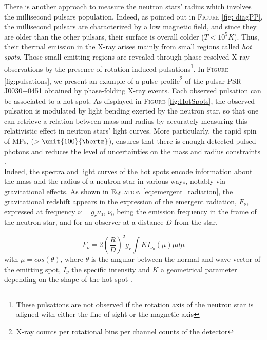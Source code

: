 \documentclass[a4paper, twoside, 12pt]{article}
\numberwithin{equation}{section}
\begin{document}
There is another approach to measure the neutron stars' radius which involves the millisecond pulsars population. Indeed, as pointed out in F\textsc{igure} \ref{fig: diagPP}, the millisecond pulsars are characterized by a low magnetic field, and since they are older than the other pulsars, their surface is overall colder ($T < 10^5 K$). 
Thus, their thermal emission in the X-ray arises mainly from small regions called {\itshape{hot spots}}. Those small emitting regions are revealed through phase-resolved X-ray observations by the presence of rotation-induced pulsations\footnote{These pulsations are not observed if the rotation axis of the neutron star is aligned with either the line of sight or the magnetic axis}. In F\textsc{igure} \ref{fig:pulsations}, we present an example of a pulse profile\footnote{ X-ray counts per rotational bins per channel counts of the detector}  of the pulsar PSR J0030+0451 obtained by phase-folding X-ray events. Each observed pulsation can be associated to a hot spot. As displayed in F\textsc{igure} \ref{fig:HotSpots}, the observed pulsation is modulated by light bending exerted by the neutron star, so that one can retrieve a relation between mass and radius by accurately measuring this relativistic effect in neutron stars' light curves. More particularly, the rapid spin of MPs, ($> \unit{100}{\hertz}$), ensures that there is enough detected pulsed photons and reduces the level of uncertainties on the mass and radius constraints \cite{Riley+19}.   \\

Indeed, the spectra and light curves of the hot spots encode information about the mass and the radius of a neutron star in various ways, notably via gravitational effects. As shown in E\textsc{quation} \ref{eq:emergent_radiation},  the gravitational redshift appears in the expression of the emergent radiation, $F_{\nu}$, expressed at  frequency $\nu = g_{r}\nu_{0}$, $\nu_{0}$ being the emission frequency in the frame of the neutron star, and for an observer at a distance $D$ from the star. 

\begin{equation}
F_{\nu} = 2 	\left( \frac{R}{D}\right)^2 g_{r} \int{K I_{\nu_{0}}(\mu) \mu d\mu}
\label{eq:emergent_radiation}
\end{equation}
with $\mu= cos(\theta)$, where $\theta$ is the angular between the normal and wave vector of the emitting spot, $I_{\nu}$ the specific intensity and $K$ a geometrical parameter depending on the shape of the hot spot \cite{HotSpots}. \\
\end{document}
